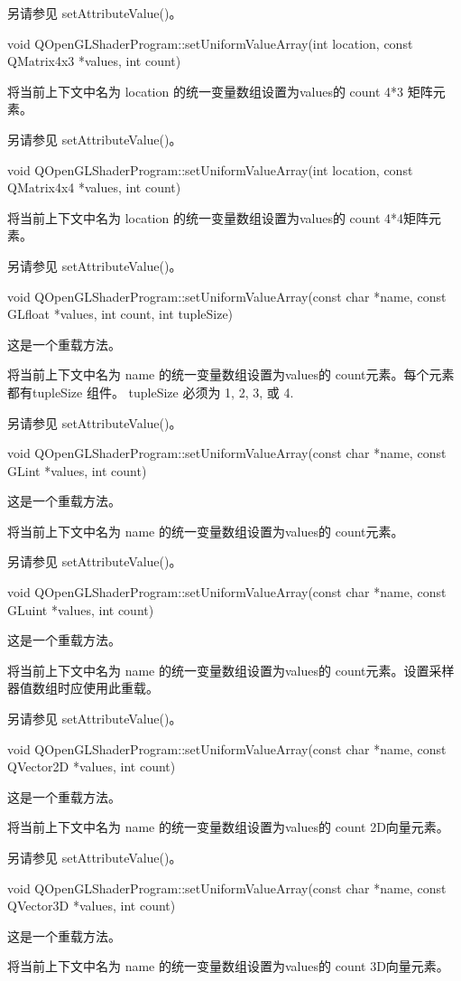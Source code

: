 另请参见 setAttributeValue()。

void QOpenGLShaderProgram::setUniformValueArray(int location, const QMatrix4x3 *values, int count)

将当前上下文中名为 location 的统一变量数组设置为values的 count 4*3 矩阵元素。

另请参见 setAttributeValue()。

void QOpenGLShaderProgram::setUniformValueArray(int location, const QMatrix4x4 *values, int count)

将当前上下文中名为 location 的统一变量数组设置为values的 count 4*4矩阵元素。

另请参见 setAttributeValue()。

void QOpenGLShaderProgram::setUniformValueArray(const char *name, const GLfloat *values, int count, int tupleSize)

这是一个重载方法。

将当前上下文中名为 name 的统一变量数组设置为values的 count元素。每个元素都有tupleSize 组件。 tupleSize 必须为 1, 2, 3, 或 4.

另请参见 setAttributeValue()。

void QOpenGLShaderProgram::setUniformValueArray(const char *name, const GLint *values, int count)

这是一个重载方法。

将当前上下文中名为 name 的统一变量数组设置为values的 count元素。

另请参见 setAttributeValue()。

void QOpenGLShaderProgram::setUniformValueArray(const char *name, const GLuint *values, int count)

这是一个重载方法。

将当前上下文中名为 name 的统一变量数组设置为values的 count元素。设置采样器值数组时应使用此重载。

另请参见 setAttributeValue()。

void QOpenGLShaderProgram::setUniformValueArray(const char *name, const QVector2D *values, int count)

这是一个重载方法。

将当前上下文中名为 name 的统一变量数组设置为values的 count 2D向量元素。

另请参见 setAttributeValue()。

void QOpenGLShaderProgram::setUniformValueArray(const char *name, const QVector3D *values, int count)

这是一个重载方法。

将当前上下文中名为 name 的统一变量数组设置为values的 count 3D向量元素。

